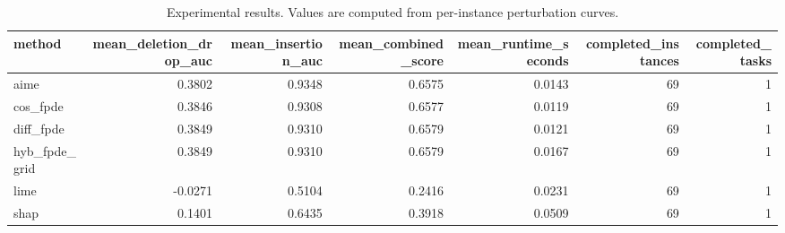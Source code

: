 \begin{table}[t]
\caption{Experimental results. Values are computed from per-instance perturbation curves.}
\label{tab:main_results_computed}
\centering
\begin{tabular}{lrrrrrr}
\toprule
method & mean\_deletion\_drop\_auc & mean\_insertion\_auc & mean\_combined\_score & mean\_runtime\_seconds & completed\_instances & completed\_tasks \\
\midrule
aime & 0.3802 & 0.9348 & 0.6575 & 0.0143 & 69 & 1 \\
cos\_fpde & 0.3846 & 0.9308 & 0.6577 & 0.0119 & 69 & 1 \\
diff\_fpde & 0.3849 & 0.9310 & 0.6579 & 0.0121 & 69 & 1 \\
hyb\_fpde\_grid & 0.3849 & 0.9310 & 0.6579 & 0.0167 & 69 & 1 \\
lime & -0.0271 & 0.5104 & 0.2416 & 0.0231 & 69 & 1 \\
shap & 0.1401 & 0.6435 & 0.3918 & 0.0509 & 69 & 1 \\
\bottomrule
\end{tabular}

\end{table}
